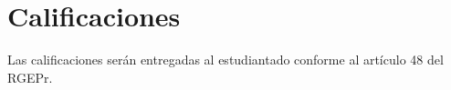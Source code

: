 \section{Calificaciones}
Las calificaciones serán entregadas al estudiantado conforme al artículo 48 del RGEPr.
